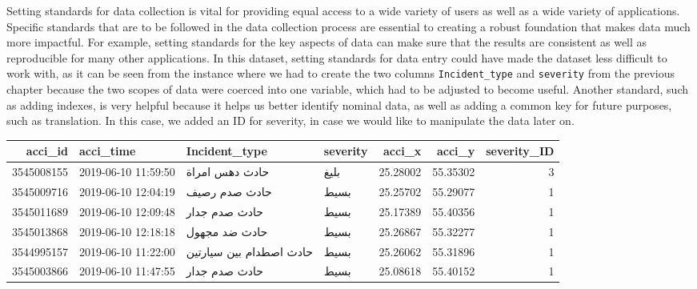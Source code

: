 \documentclass[
]{book}
\newenvironment{Shaded}{\begin{snugshade}}{\end{snugshade}}
\newcommand{\DataTypeTok}[1]{\textcolor[rgb]{0.13,0.29,0.53}{#1}}
\newcommand{\DecValTok}[1]{\textcolor[rgb]{0.00,0.00,0.81}{#1}}
\newcommand{\KeywordTok}[1]{\textcolor[rgb]{0.13,0.29,0.53}{\textbf{#1}}}
\newcommand{\NormalTok}[1]{#1}
\newcommand{\OperatorTok}[1]{\textcolor[rgb]{0.81,0.36,0.00}{\textbf{#1}}}
\newcommand{\StringTok}[1]{\textcolor[rgb]{0.31,0.60,0.02}{#1}}
\begin{document}
Setting standards for data collection is vital for providing equal access to a wide variety of users as well as a wide variety of applications. Specific standards that are to be followed in the data collection process are essential to creating a robust foundation that makes data much more impactful. For example, setting standards for the key aspects of data can make sure that the results are consistent as well as reproducible for many other applications. In this dataset, setting standards for data entry could have made the dataset less difficult to work with, as it can be seen from the instance where we had to create the two columns \texttt{Incident\_type} and \texttt{severity} from the previous chapter because the two scopes of data were coerced into one variable, which had to be adjusted to become useful. Another standard, such as adding indexes, is very helpful because it helps us better identify nominal data, as well as adding a common key for future purposes, such as translation. In this case, we added an ID for severity, in case we would like to manipulate the data later on.

\begin{Shaded}
\end{Shaded}

\begin{tabular}{r|l|l|l|r|r|r}
\hline
acci\_id & acci\_time & Incident\_type & severity & acci\_x & acci\_y & severity\_ID\\
\hline
3545008155 & 2019-06-10 11:59:50 & حادث دهس امراة & بليغ & 25.28002 & 55.35302 & 3\\
\hline
3545009716 & 2019-06-10 12:04:19 & حادث صدم رصيف & بسيط & 25.25702 & 55.29077 & 1\\
\hline
3545011689 & 2019-06-10 12:09:48 & حادث صدم جدار & بسيط & 25.17389 & 55.40356 & 1\\
\hline
3545013868 & 2019-06-10 12:18:18 & حادث ضد مجهول & بسيط & 25.26867 & 55.32277 & 1\\
\hline
3544995157 & 2019-06-10 11:22:00 & حادث اصطدام بين سيارتين & بسيط & 25.26062 & 55.31896 & 1\\
\hline
3545003866 & 2019-06-10 11:47:55 & حادث صدم جدار & بسيط & 25.08618 & 55.40152 & 1\\
\hline
\end{tabular}
\end{document}
